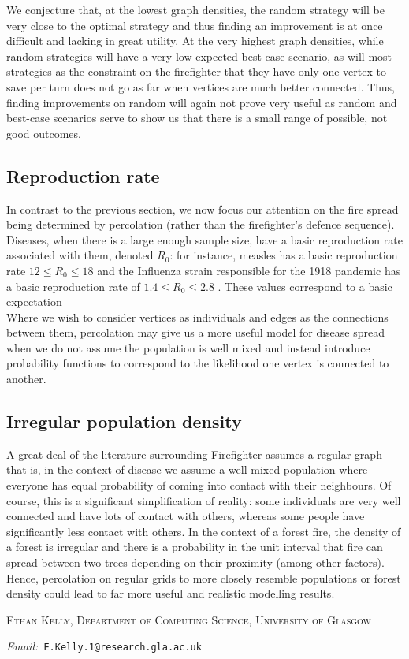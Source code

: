 \documentclass[11pt]{amsart}
\makeatletter
\newcommand{\Addresses}{{%
  \bigskip
  \footnotesize
  \textsc{Ethan Kelly, Department of Computing Science, University of Glasgow}\par\nopagebreak
   \textit{Email:~}\texttt{E.Kelly.1@research.gla.ac.uk}

}}
\makeatother
\begin{document}
We conjecture that, at the lowest graph densities, the random strategy will be very close to the optimal strategy and thus finding an improvement is at once difficult and lacking in great utility. At the very highest graph densities, while random strategies will have a very low expected best-case scenario, as will most strategies as the constraint on the firefighter that they have only one vertex to save per turn does not go as far when vertices are much better connected. Thus, finding improvements on random will again not prove very useful as random and best-case scenarios serve to show us that there is a small range of possible, not good outcomes.

\subsection{Reproduction rate}
In contrast to the previous section, we now focus our attention on the fire spread being determined by percolation (rather than the firefighter's defence sequence). Diseases, when there is a large enough sample size, have a basic reproduction rate associated with them, denoted $R_0$: for instance, measles has a basic reproduction rate $12\leq R_0 \leq 18$ \cite{fiona17} and the Influenza strain responsible for the 1918 pandemic has a basic reproduction rate of $1.4 \leq R_0 \leq 2.8$ \cite{ferguson06}. These values correspond to a basic expectation \\

Where we wish to consider vertices as individuals and edges as the connections between them, percolation may give us a more useful model for disease spread when we do not assume the population is well mixed and instead introduce probability functions to correspond to the likelihood one vertex is connected to another. 


\subsection{Irregular population density}
A great deal of the literature surrounding Firefighter assumes a regular graph - that is, in the context of disease we assume a well-mixed population where everyone has equal probability of coming into contact with their neighbours. Of course, this is a significant simplification of reality: some individuals are very well connected and have lots of contact with others, whereas some people have significantly less contact with others. In the context of a forest fire, the density of a forest is irregular and there is a probability in the unit interval that fire can spread between two trees depending on their proximity (among other factors). Hence, percolation on regular grids to more closely resemble populations or forest density could lead to far more useful and realistic modelling results.





\Addresses
\end{document}
